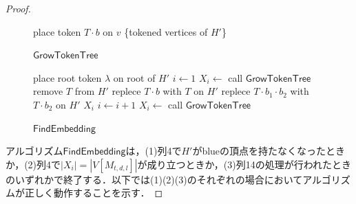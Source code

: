 \documentclass[master]{kuisthesis}		%
\theoremstyle{plain}
\theoremstyle{definition}
\begin{document}
\begin{proof}
\begin{figure}[!t]
\begin{algorithm}[H]
	\caption{$\mathsf{GrowTokenTree}$}
	\label{growtokentree}
	\begin{algorithmic}[1]
    \STATE place token $T \cdot b$ on $v$
    \ENDWHILE
    \RETURN \{tokened vertices of $H'$\}
	\end{algorithmic}
\end{algorithm}
\end{figure}



\begin{figure}[!t]
\begin{algorithm}[H]
    \caption{$\mathsf{FindEmbedding}$}
	\label{findEmbedding}
	\begin{algorithmic}[1]
    \STATE place root token $\lambda$ on root of $H'$
    \STATE $i \leftarrow 1$
    \STATE $X_i  \leftarrow$ call $\mathsf{GrowTokenTree}$
    \STATE remove $T$ from $H'$
    \STATE replece $T \cdot b$ with $T$ on $H'$
    \ENDIF
    \STATE replece $T \cdot b_1 \cdot b_2$ with $T \cdot b_2$ on $H'$
    \ENDWHILE
    \ELSE
    \RETURN $X_i$
    \ENDIF
    \STATE $i \leftarrow i+1$
    \STATE $X_i \leftarrow$ call $\mathsf{GrowTokenTree}$
    \ENDWHILE
	\end{algorithmic}
\end{algorithm}
\end{figure}


アルゴリズム$\mathsf{FindEmbedding}$は，(1)列4で$H'$がblueの頂点を持たなくなったときか，(2)列4で$|X_i| = |V[M_{t, d, l}]|$が成り立つときか，(3)列14の処理が行われたときのいずれかで終了する．以下では(1)(2)(3)のそれぞれの場合においてアルゴリズムが正しく動作することを示す．


\end{proof}
\end{document}
